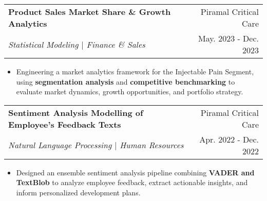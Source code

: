 \documentclass[letter paper,11pt]{article}
\makeatletter
\newcommand{\resumeItem}[1]{
\justifying
\vspace{-3pt}
  \item\small{
    {#1}
  }
}
\newcommand{\resumeProjectHeading}[4]{
    \vspace{-10pt}
    \item
    \begin{tabular*}{1\textwidth}{l@{\extracolsep{\fill}}r}
      {\small#1} & {\small#2} \\
      \textit{{\small#3}} & {\small#4}
    \end{tabular*}\vspace{-14pt}
}
\newcommand{\resumeItemListStart}{\begin{itemize}}
\newcommand{\resumeItemListEnd}{\end{itemize}}
\makeatother
\begin{document}
    
     \resumeProjectHeading
          {\textbf{Product Sales Market Share \& Growth Analytics}}
          {Piramal Critical Care}
          {Statistical Modeling $|$ Finance \& Sales}
          {May. 2023 - Dec. 2023}
          
          \resumeItemListStart
            \resumeItem{Engineering a market analytics framework for the Injectable Pain Segment, using \textbf{segmentation analysis} and \textbf{competitive benchmarking} to evaluate market dynamics, growth opportunities, and portfolio strategy.}
          \resumeItemListEnd

      
           \resumeProjectHeading
          {\textbf{Sentiment Analysis Modelling of Employee's Feedback Texts}}
          {Piramal Critical Care}
          {Natural Language Processing $|$ Human Resources}
          {Apr. 2022 - Dec. 2022}
          
          \resumeItemListStart
            \resumeItem{Designed an ensemble sentiment analysis pipeline combining \textbf{VADER and TextBlob} to analyze employee feedback, extract actionable insights, and inform personalized development plans.}
          \resumeItemListEnd
          
    
          
      


    

          
            
\end{document}
